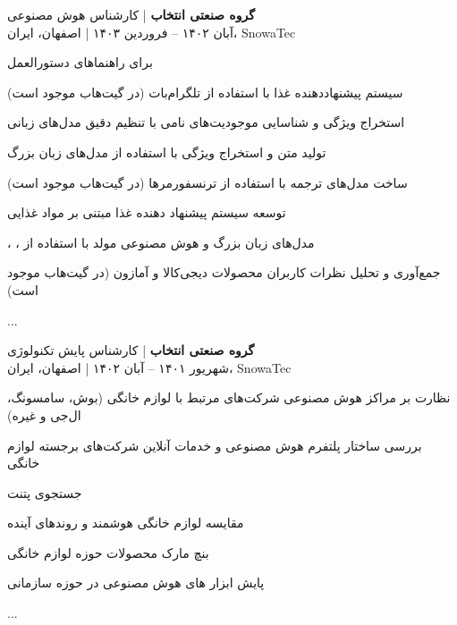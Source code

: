 \documentclass[a4paper]{deedy-persian} %
\begin{document}
\begin{minipage}[t]{0.62\textwidth}
\textbf{گروه صنعتی انتخاب} | کارشناس هوش مصنوعی \\
\vspace{\itemsep} %
آبان ۱۴۰۲ – فروردین ۱۴۰۳ | اصفهان، ایران، SnowaTec
\vspace{\itemsep} %
\begin{tightitemize}
\item {} برای راهنماهای دستورالعمل
\item سیستم پیشنهاددهنده غذا با استفاده از تلگرام‌بات (در گیت‌هاب موجود است)
\item استخراج ویژگی و شناسایی موجودیت‌های نامی با تنظیم دقیق مدل‌های زبانی
\item تولید متن و استخراج ویژگی با استفاده از مدل‌های زبان بزرگ
\item ساخت مدل‌های ترجمه با استفاده از ترنسفورمرها (در گیت‌هاب موجود است)
\item توسعه سیستم پیشنهاد دهنده غذا مبتنی بر مواد غذایی 
\item {}، ، مدل‌های زبان بزرگ و هوش مصنوعی مولد با استفاده از 
\item جمع‌آوری و تحلیل نظرات کاربران محصولات دیجی‌کالا و آمازون (در گیت‌هاب موجود است)
\item ...
\end{tightitemize}
\vspace{\topsep} %

\textbf{گروه صنعتی انتخاب} | کارشناس پایش تکنولوژی \\
\vspace{\itemsep} %
شهریور ۱۴۰۱ – آبان ۱۴۰۲ | اصفهان، ایران، SnowaTec
\vspace{\itemsep} %
\begin{tightitemize}
\item نظارت بر مراکز هوش مصنوعی شرکت‌های مرتبط با لوازم خانگی (بوش، سامسونگ، ال‌جی و غیره)
\item بررسی ساختار پلتفرم هوش مصنوعی و خدمات آنلاین شرکت‌های برجسته لوازم خانگی
\item جستجوی پتنت
\item مقایسه لوازم خانگی هوشمند و روندهای آینده
\item بنچ مارک محصولات حوزه لوازم خانگی
\item پایش ابزار های هوش مصنوعی در حوزه سازمانی
\item ...
\end{tightitemize}
\vspace{\topsep} %

\end{minipage} %
\end{document}
